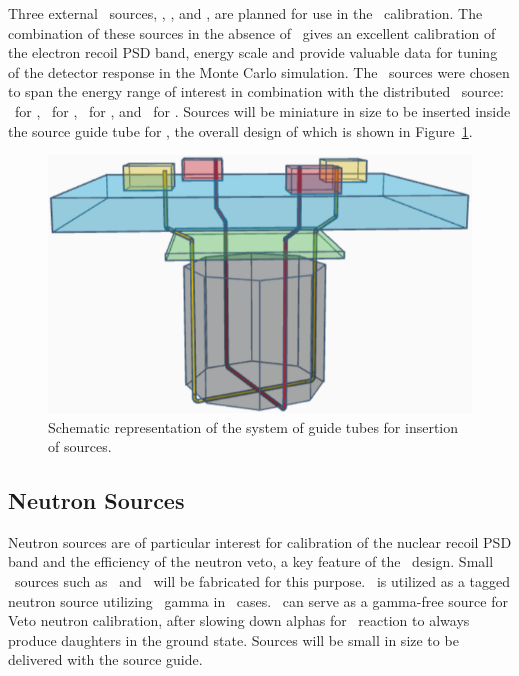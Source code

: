 Three external \gr\ sources, , \Ba, and \Cs, are planned for use in the \TPC\ calibration. The combination of these sources in the absence of \ArThirtyNine\ gives an excellent calibration of the electron recoil PSD band, energy scale and provide valuable data for tuning of the detector response in the Monte Carlo simulation. The \gr\ sources were chosen to span the energy range of interest in combination with the distributed \Kr\ source: \KrEightThreeMOneTwoECEnergy\ for \Kr, \CoEnergy\ for , \BaEnergy\ for \Ba, and \CsEnergy\ for \Cs.  Sources will be miniature in size to be inserted inside the source guide tube for \TPC, the overall design of which is shown in Figure~\ref{fig:Calibration-OverallSystemDesign}.

\begin{figure}[t!]
\includegraphics[width=\textwidth]{./Figures/Calibration-OverallSystemDesign.png}
\caption[Schematic of the sources insertion system]{Schematic representation of the system of guide tubes for insertion of sources.}
\label{fig:Calibration-OverallSystemDesign}
\end{figure}


\subsection{Neutron Sources}

Neutron sources are of particular interest for calibration of the nuclear recoil PSD band and the efficiency of the neutron veto, a key feature of the \DSks\ design.  Small \alphan\ sources such as \AmBe\ and \AmC\ will be fabricated for this purpose. \AmBe\ is utilized as a tagged neutron source utilizing \AmBeGammaEnergy\ gamma in \AmTwoFourOneGammaTwoBR\ cases. \AmC\ can serve as a gamma-free source for Veto neutron calibration, after slowing down alphas for \alphan\ reaction to always produce daughters in the ground state. Sources will be small in size to be delivered with the source guide. 

